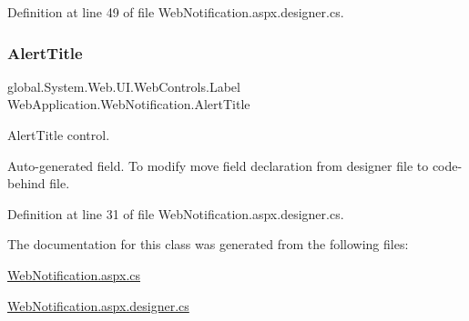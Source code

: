 Definition at line 49 of file Web\+Notification.\+aspx.\+designer.\+cs.

\mbox{\label{classWebApplication_1_1WebNotification_ae5e61b002ffea74359abf68c0ec09d7e}} 
\subsubsection{\texorpdfstring{AlertTitle}{AlertTitle}}
{\footnotesize\ttfamily global.\+System.\+Web.\+U\+I.\+Web\+Controls.\+Label Web\+Application.\+Web\+Notification.\+Alert\+Title\hspace{0.3cm}{\ttfamily [protected]}}



Alert\+Title control. 

Auto-\/generated field. To modify move field declaration from designer file to code-\/behind file. 

Definition at line 31 of file Web\+Notification.\+aspx.\+designer.\+cs.



The documentation for this class was generated from the following files\+:\begin{DoxyCompactItemize}
\item 
\mbox{\hyperlink{WebNotification_8aspx_8cs}{Web\+Notification.\+aspx.\+cs}}\item 
\mbox{\hyperlink{WebNotification_8aspx_8designer_8cs}{Web\+Notification.\+aspx.\+designer.\+cs}}\end{DoxyCompactItemize}
